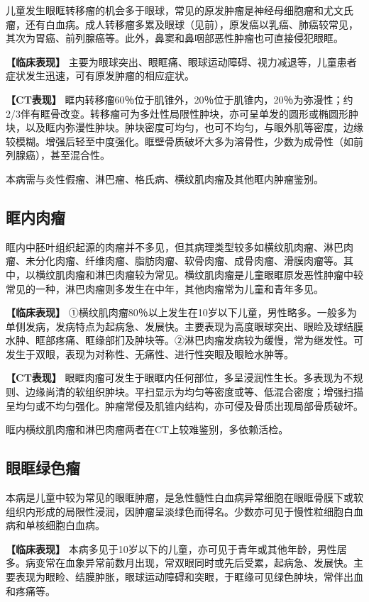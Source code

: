 儿童发生眼眶转移瘤的机会多于眼球，常见的原发肿瘤是神经母细胞瘤和尤文氏瘤，还有白血病。成人转移瘤多累及眼球（见前），原发癌以乳癌、肺癌较常见，其次为胃癌、前列腺癌等。此外，鼻窦和鼻咽部恶性肿瘤也可直接侵犯眼眶。

\textbf{【临床表现】}
主要为眼球突出、眼眶痛、眼球运动障碍、视力减退等，儿童患者症状发生迅速，可有原发肿瘤的相应症状。

\textbf{【CT表现】}
眶内转移瘤60％位于肌锥外，20％位于肌锥内，20％为弥漫性；约2/3伴有眶骨改变。转移瘤可为多灶性局限性肿块，亦可呈单发的圆形或椭圆形肿块，以及眶内弥漫性肿块。肿块密度可均匀，也可不均匀，与眼外肌等密度，边缘较模糊。增强后轻至中度强化。眶壁骨质破坏大多为溶骨性，少数为成骨性（如前列腺癌），甚至混合性。

本病需与炎性假瘤、淋巴瘤、格氏病、横纹肌肉瘤及其他眶内肿瘤鉴别。

\subsection{眶内肉瘤}

眶内中胚叶组织起源的肉瘤并不多见，但其病理类型较多如横纹肌肉瘤、淋巴肉瘤、未分化肉瘤、纤维肉瘤、脂肪肉瘤、软骨肉瘤、成骨肉瘤、滑膜肉瘤等。其中，以横纹肌肉瘤和淋巴肉瘤较为常见。横纹肌肉瘤是儿童眼眶原发恶性肿瘤中较常见的一种，淋巴肉瘤则多发生在中年，其他肉瘤常为儿童和青年多见。

\textbf{【临床表现】}
①横纹肌肉瘤80％以上发生在10岁以下儿童，男性略多。一般多为单侧发病，发病特点为起病急、发展快。主要表现为高度眼球突出、眼睑及球结膜水肿、眶部疼痛、眶缘部扪及肿块等。②淋巴肉瘤发病较为缓慢，常为继发性。可发生于双眼，表现为对称性、无痛性、进行性突眼及眼睑水肿等。

\textbf{【CT表现】}
眼眶肉瘤可发生于眼眶内任何部位，多呈浸润性生长。多表现为不规则、边缘尚清的软组织肿块。平扫显示为均匀等密度或等、低混合密度；增强扫描呈均匀或不均匀强化。肿瘤常侵及肌锥内结构，亦可侵及骨质出现局部骨质破坏。

眶内横纹肌肉瘤和淋巴肉瘤两者在CT上较难鉴别，多依赖活检。

\subsection{眼眶绿色瘤}

本病是儿童中较为常见的眼眶肿瘤，是急性髓性白血病异常细胞在眼眶骨膜下或软组织内形成的局限性浸润，因肿瘤呈淡绿色而得名。少数亦可见于慢性粒细胞白血病和单核细胞白血病。

\textbf{【临床表现】}
本病多见于10岁以下的儿童，亦可见于青年或其他年龄，男性居多。病变常在血象异常前数月出现，常双眼同时或先后受累，起病急、发展快。主要表现为眼睑、结膜肿胀，眼球运动障碍和突眼，于眶缘可见绿色肿块，常伴出血和疼痛等。

